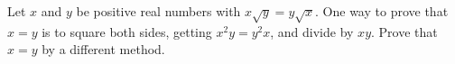 Let $x$ and $y$ be positive real numbers with $x\sqrt y=y\sqrt x$. One way to prove that $x=y$ is to square both sides, getting $x^2y=y^2x$, and divide by $xy$. Prove that $x=y$ by a different method.
